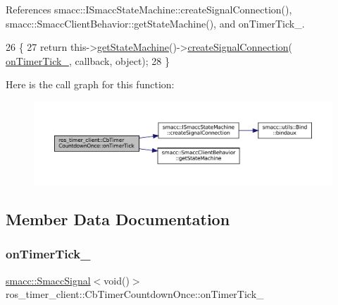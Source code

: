 References smacc\+::\+I\+Smacc\+State\+Machine\+::create\+Signal\+Connection(), smacc\+::\+Smacc\+Client\+Behavior\+::get\+State\+Machine(), and on\+Timer\+Tick\+\_\+.


\begin{DoxyCode}
26     \{
27         \textcolor{keywordflow}{return} this->\hyperlink{classsmacc_1_1SmaccClientBehavior_aa817da149f366f6a28794c04eb0744b0}{getStateMachine}()->\hyperlink{classsmacc_1_1ISmaccStateMachine_adf0f42ade0c65cc471960fe2a7c42da2}{createSignalConnection}(
      \hyperlink{classros__timer__client_1_1CbTimerCountdownOnce_a9443c6372da3a1faa917d0e9ae7ebd90}{onTimerTick\_}, callback, \textcolor{keywordtype}{object});
28     \}
\end{DoxyCode}
Here is the call graph for this function\+:
\nopagebreak
\begin{figure}[H]
\begin{center}
\leavevmode
\includegraphics[width=350pt]{classros__timer__client_1_1CbTimerCountdownOnce_a38949571cf20ca88b4a1bac881399f21_cgraph}
\end{center}
\end{figure}


\subsection{Member Data Documentation}
\mbox{\label{classros__timer__client_1_1CbTimerCountdownOnce_a9443c6372da3a1faa917d0e9ae7ebd90}} 
\subsubsection{\texorpdfstring{on\+Timer\+Tick\+\_\+}{onTimerTick\_}}
{\footnotesize\ttfamily \hyperlink{classsmacc_1_1SmaccSignal}{smacc\+::\+Smacc\+Signal}$<$void()$>$ ros\+\_\+timer\+\_\+client\+::\+Cb\+Timer\+Countdown\+Once\+::on\+Timer\+Tick\+\_\+\hspace{0.3cm}{\ttfamily [private]}}



